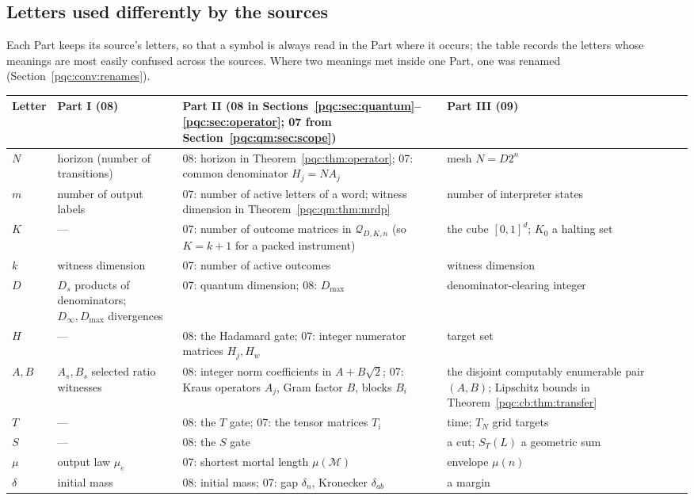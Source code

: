\documentclass[11pt,letterpaper]{article}
\numberwithin{equation}{section}
\theoremstyle{definition}
\theoremstyle{remark}
\newcommand{\Dmax}{D_{\max}}
\newcommand{\Dinf}{D_{\infty}}
\newcommand{\cenum}{computably enumerable}
\begin{document}
\subsection{Letters used differently by the sources}
\label{pqc:conv:letters}
Each Part keeps its source's letters, so that a symbol is always read in
the Part where it occurs; the table records the letters whose meanings are
most easily confused across the sources. Where two meanings met inside one Part, one was renamed
(Section~\ref{pqc:conv:renames}).

\begin{center}
\small
\begin{tabularx}{\textwidth}{@{}lXXX@{}}
\toprule
Letter & Part I (08) & Part II (08 in Sections~\ref{pqc:sec:quantum}--\ref{pqc:sec:operator}; 07 from Section~\ref{pqc:qm:sec:scope}) & Part III (09)\\
\midrule
$N$ & horizon (number of transitions) & 08: horizon in Theorem~\ref{pqc:thm:operator}; 07: common denominator $H_j=NA_j$ & mesh $N=D2^n$\\
$m$ & number of output labels & 07: number of active letters of a word; witness dimension in Theorem~\ref{pqc:qm:thm:mrdp} & number of interpreter states\\
$K$ & --- & 07: number of outcome matrices in $\mathscr Q_{D,K,n}$ (so $K=k+1$ for a packed instrument) & the cube $[0,1]^d$; $K_0$ a halting set\\
$k$ & witness dimension & 07: number of active outcomes & witness dimension\\
$D$ & $D_s$ products of denominators; $\Dinf,\Dmax$ divergences & 07: quantum dimension; 08: $\Dmax$ & denominator-clearing integer\\
$H$ & --- & 08: the Hadamard gate; 07: integer numerator matrices $H_j,H_w$ & target set\\
$A,B$ & $A_s,B_s$ selected ratio witnesses & 08: integer norm coefficients in $A+B\sqrt2$; 07: Kraus operators $A_j$, Gram factor $B$, blocks $B_i$ & the disjoint \cenum{} pair $(A,B)$; Lipschitz bounds in Theorem~\ref{pqc:cb:thm:transfer}\\
$T$ & --- & 08: the $T$ gate; 07: the tensor matrices $T_i$ & time; $T_N$ grid targets\\
$S$ & --- & 08: the $S$ gate & a cut; $S_T(L)$ a geometric sum\\
$\mu$ & output law $\mu_e$ & 07: shortest mortal length $\mu(\mathcal M)$ & envelope $\mu(n)$\\
$\delta$ & initial mass & 08: initial mass; 07: gap $\delta_n$, Kronecker $\delta_{ab}$ & a margin\\

\end{tabularx}
\end{center}
\end{document}

